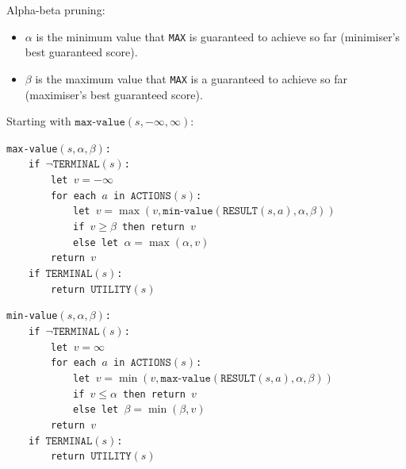 \documentclass[twocolumn,english]{article}
\begin{document}
Alpha-beta pruning:
\begin{itemize}
\item $\alpha$ is the minimum value that \texttt{MAX} is guaranteed to
achieve so far (minimiser's best guaranteed score).
\item $\beta$ is the maximum value that \texttt{MAX} is a guaranteed to
achieve so far (maximiser's best guaranteed score).
\end{itemize}
Starting with $\texttt{max-value}\left(s,-\infty,\infty\right)$:

\texttt{}
\begin{table}[H]
\raggedright{}\texttt{\small{}max-value$\left(s,\alpha,\beta\right)$:}~\\
\texttt{\small{}$\qquad$if $\lnot\texttt{TERMINAL}\left(s\right)$:}~\\
\texttt{\small{}$\qquad\qquad$let $v=-\infty$}~\\
\texttt{\small{}$\qquad\qquad$for each $a$ in $\texttt{ACTIONS}\left(s\right)$:}~\\
\texttt{\small{}$\qquad\qquad\qquad$let $v=\max\left(v,\texttt{min-value}\left(\texttt{RESULT}\left(s,a\right),\alpha,\beta\right)\right)$}~\\
\texttt{\small{}$\qquad\qquad\qquad$if $v\geq\beta$ then return
$v$}~\\
\texttt{\small{}$\qquad\qquad\qquad$else let $\alpha=\max\left(\alpha,v\right)$}~\\
\texttt{\small{}$\qquad\qquad$return $v$}~\\
\texttt{\small{}$\qquad$if $\texttt{TERMINAL}\left(s\right)$:}~\\
\texttt{\small{}$\qquad\qquad$return $\texttt{UTILITY}\left(s\right)$}
\end{table}
\texttt{}
\begin{table}[H]
\raggedright{}\texttt{\small{}min-value$\left(s,\alpha,\beta\right)$:}~\\
\texttt{\small{}$\qquad$if $\lnot\texttt{TERMINAL}\left(s\right)$:}~\\
\texttt{\small{}$\qquad\qquad$let $v=\infty$}~\\
\texttt{\small{}$\qquad\qquad$for each $a$ in $\texttt{ACTIONS}\left(s\right)$:}~\\
\texttt{\small{}$\qquad\qquad\qquad$let $v=\min\left(v,\texttt{max-value}\left(\texttt{RESULT}\left(s,a\right),\alpha,\beta\right)\right)$}~\\
\texttt{\small{}$\qquad\qquad\qquad$if $v\leq\alpha$ then return
$v$}~\\
\texttt{\small{}$\qquad\qquad\qquad$else let $\beta=\min\left(\beta,v\right)$}~\\
\texttt{\small{}$\qquad\qquad$return $v$}~\\
\texttt{\small{}$\qquad$if $\texttt{TERMINAL}\left(s\right)$:}~\\
\texttt{\small{}$\qquad\qquad$return $\texttt{UTILITY}\left(s\right)$}
\end{table}
\end{document}
